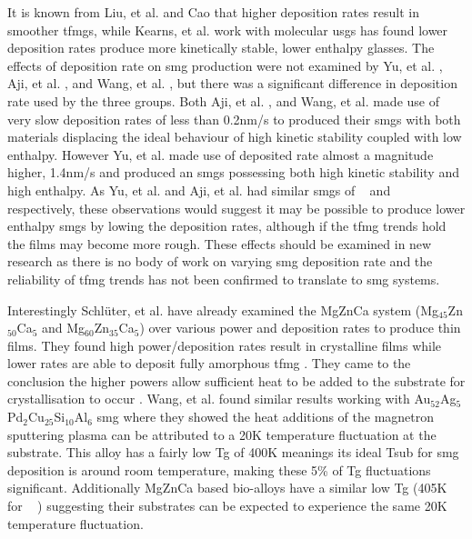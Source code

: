 \documentclass[a4paper,12pt,oneside]{report}%
\begin{document}
It is known from Liu, et al. \cite{Liu2012} and Cao \cite{Cao2013} that higher deposition rates result in smoother \glspl{tfmg}, while Kearns, et al. \cite{Kearns2008} work with molecular \glspl{usg} has found lower deposition rates produce more kinetically stable, lower enthalpy glasses. The effects of deposition rate on \gls{smg} production were not examined by Yu, et al. \cite{Yu2013}, Aji, et al. \cite{Aji2013}, and Wang, et al. \cite{Wang2014}, but there was a significant difference in deposition rate used by the three groups. Both Aji, et al. \cite{Aji2013}, and Wang, et al. \cite{Wang2014} made use of very slow deposition rates of less than 0.2nm/s to produced their \glspl{smg} with both materials displacing the ideal behaviour of high kinetic stability coupled with low enthalpy. However Yu, et al. \cite{Yu2013} made use of deposited rate almost a magnitude higher, 1.4nm/s and produced an \glspl{smg} possessing both high kinetic stability and high enthalpy. As Yu, et al. \cite{Yu2013} and Aji, et al. \cite{Aji2013} had similar \glspl{smg} of \ZrCuAl~ and \ZrCuNiAl~ respectively, these observations would suggest it may be possible to produce lower enthalpy \glspl{smg} by lowing the deposition rates, although if the \gls{tfmg} trends hold the films may become more rough. These effects should be examined in new research as there is no body of work on varying \gls{smg} deposition rate and the reliability of \gls{tfmg} trends has not been confirmed to translate to \gls{smg} systems. 

Interestingly Schl{\"u}ter, et al. \cite{Schluter2012} have already examined the MgZnCa system (Mg$_{45}$Zn$_{50}$Ca$_{5}$ and Mg$_{60}$Zn$_{35}$Ca$_{5}$) over various power and deposition rates to produce thin films. They found high power/deposition rates result in crystalline films while lower rates are able to deposit fully amorphous  \gls{tfmg} \cite{Schluter2012}. They came to the conclusion the higher powers allow sufficient heat to be added to the substrate for crystallisation to occur \cite{Schluter2012}. Wang, et al. \cite{Wang2014} found similar results working with Au$_{52}$Ag$_{5}$Pd$_{2}$Cu$_{25}$Si$_{10}$Al$_{6}$ \gls{smg} where they showed the heat additions of the magnetron sputtering plasma can be attributed to a 20K temperature fluctuation at the substrate. This alloy has a fairly low \gls{Tg} of 400K meanings its ideal \gls{Tsub} for \gls{smg} deposition is around room temperature, making these 5\% of \gls{Tg} fluctuations significant. Additionally MgZnCa based bio-alloys have a similar low \gls{Tg} (405K for \MgZnCa~ \cite{Cao2013b, Gu2005}) suggesting their substrates can be expected to experience the same 20K temperature fluctuation. 
\end{document}

